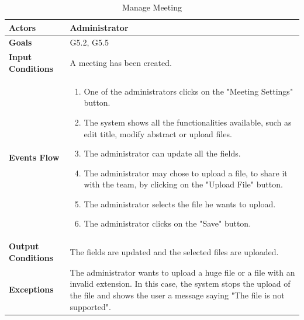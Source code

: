 \begin{table}[H]
\centering
\def\arraystretch{1.5}
\begin{tabular}{|p{7cm}|p{7cm}|}
	\hline
	\textbf{Actors}            & Administrator    \\ \hline
	\textbf{Goals}             & G5.2, G5.5           \\ \hline
	\textbf{Input Conditions}  & A meeting has been created.           \\ \hline
	\textbf{Events Flow}       &  
	\begin{enumerate}[topsep=0pt, leftmargin=*]
		\item One of the administrators clicks on the "Meeting Settings" button.
		\item The system shows all the functionalities available, such as edit title, modify abstract or upload files.
		\item The administrator can update all the fields.
		\item The administrator may chose to upload a file, to share it with the team, by clicking on the "Upload File" button.
		\item The administrator selects the file he wants to upload.
		\item The administrator clicks on the "Save" button.
	\end{enumerate}             \\ \hline
	\textbf{Output Conditions} & The fields are updated and the selected files are uploaded.          \\ \hline
	\textbf{Exceptions}        & The administrator wants  to upload a huge file or a file with an invalid extension. In this case, the system stops the upload of the file and shows the user a message saying "The file is not supported". \\ \hline
\end{tabular}
\caption{Manage Meeting}
\end{table}

